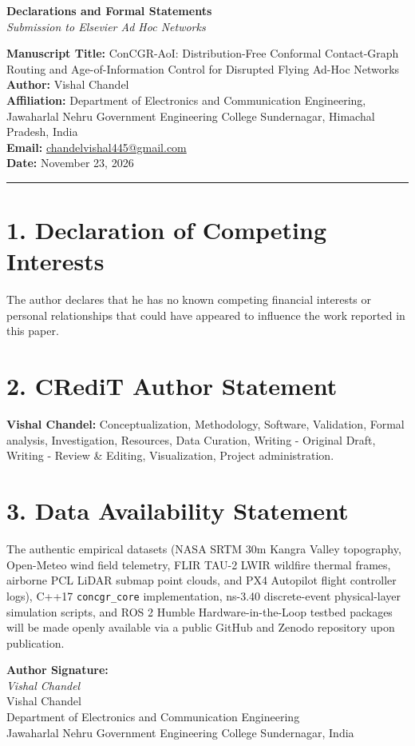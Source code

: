 \documentclass[11pt,a4paper]{article}
\begin{document}
\begin{center}
{\Large \textbf{Declarations and Formal Statements}}\\[0.4em]
{\large \textit{Submission to Elsevier Ad Hoc Networks}}\\[1.0em]
\end{center}

\noindent
\textbf{Manuscript Title:} ConCGR-AoI: Distribution-Free Conformal Contact-Graph Routing and Age-of-Information Control for Disrupted Flying Ad-Hoc Networks\\
\textbf{Author:} Vishal Chandel\\
\textbf{Affiliation:} Department of Electronics and Communication Engineering, Jawaharlal Nehru Government Engineering College Sundernagar, Himachal Pradesh, India\\
\textbf{Email:} \href{mailto:chandelvishal445@gmail.com}{chandelvishal445@gmail.com}\\
\textbf{Date:} November 23, 2026

\vspace{1.5em}
\hrule
\vspace{1.2em}

\section*{1. Declaration of Competing Interests}
The author declares that he has no known competing financial interests or personal relationships that could have appeared to influence the work reported in this paper.

\vspace{1.2em}
\section*{2. CRediT Author Statement}
\textbf{Vishal Chandel:} Conceptualization, Methodology, Software, Validation, Formal analysis, Investigation, Resources, Data Curation, Writing - Original Draft, Writing - Review \& Editing, Visualization, Project administration.

\vspace{1.2em}
\section*{3. Data Availability Statement}
The authentic empirical datasets (NASA SRTM 30m Kangra Valley topography, Open-Meteo wind field telemetry, FLIR TAU-2 LWIR wildfire thermal frames, airborne PCL LiDAR submap point clouds, and PX4 Autopilot flight controller logs), C++17 \texttt{concgr\_core} implementation, ns-3.40 discrete-event physical-layer simulation scripts, and ROS 2 Humble Hardware-in-the-Loop testbed packages will be made openly available via a public GitHub and Zenodo repository upon publication.

\vspace{2.0em}
\noindent
\textbf{Author Signature:}\\
\textit{Vishal Chandel}\\
Vishal Chandel\\
Department of Electronics and Communication Engineering\\
Jawaharlal Nehru Government Engineering College Sundernagar, India
\end{document}
